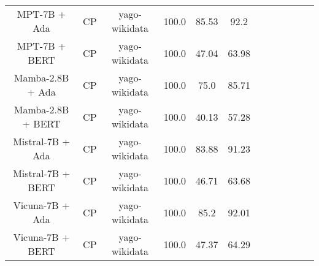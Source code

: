 \begin{table}
\begin{tabular}{|c|c|c|c|c|c|c|c|c|c|c|c|}
	MPT-7B + Ada  & CP & yago-wikidata  &  100.0 &  85.53 & 92.2  \\
	MPT-7B + BERT  & CP & yago-wikidata  &  100.0 &  47.04 & 63.98  \\
	Mamba-2.8B + Ada  & CP & yago-wikidata  &  100.0 &  75.0 & 85.71  \\
	Mamba-2.8B + BERT  & CP & yago-wikidata  &  100.0 &  40.13 & 57.28  \\
	Mistral-7B + Ada  & CP & yago-wikidata  &  100.0 &  83.88 & 91.23  \\
	Mistral-7B + BERT  & CP & yago-wikidata  &  100.0 &  46.71 & 63.68  \\
	Vicuna-7B + Ada  & CP & yago-wikidata  &  100.0 &  85.2 & 92.01  \\
	Vicuna-7B + BERT  & CP & yago-wikidata  &  100.0 &  47.37 & 64.29  \\
	\hline
\end{tabular}
    \end{table}
